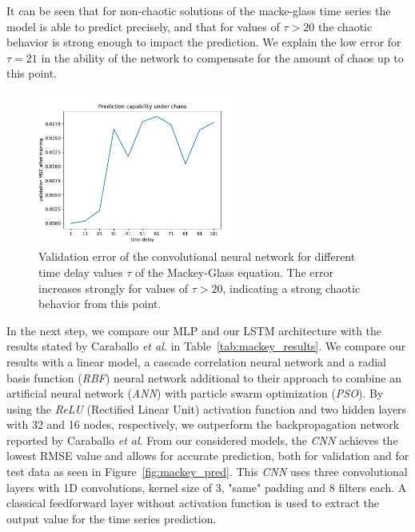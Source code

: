 \documentclass{article}
\begin{document}
It can be seen that for non-chaotic solutions of the macke-glass time series the
model is able to predict precisely, and that for values of $\tau > 20$ the
chaotic behavior is strong enough to impact the prediction. We explain the low
error for $\tau = 21$ in the ability of the network to compensate for the amount
of chaos up to this point.

\begin{figure}
    \centering
    \includegraphics[width=0.6\textwidth]{figures/mackey_glass_cnn.pdf}
    \caption{Validation error of the convolutional neural network for different
        time delay values $\tau$ of the Mackey-Glass equation. The error increases
        strongly for values of $\tau > 20$, indicating a strong chaotic behavior
        from this point.}
    \label{fig:mackey_cnn}
\end{figure}

In the next step, we compare our MLP and our LSTM
architecture with the results stated by Caraballo \textit{et al.}
\cite{caraballo2016} in Table~\ref{tab:mackey_results}. We
compare our results with a linear model, a cascade correlation neural network
and a radial basis function (\emph{RBF})
neural network additional to their approach to
combine an artificial neural network (\emph{ANN}) with particle swarm
optimization (\emph{PSO}). By
using the \emph{ReLU} (Rectified Linear Unit) activation function and two
hidden layers with 32 and 16 nodes, respectively, we outperform the
backpropagation network reported by Caraballo \textit{et al}.
From our considered models, the \emph{CNN} achieves the lowest RMSE value and
allows for accurate prediction, both for validation and for test data as seen
in Figure~\ref{fig:mackey_pred}. This \emph{CNN} uses three convolutional layers
with 1D convolutions, kernel size of 3, "same" padding and 8
filters each. A classical
feedforward layer without activation function is used to extract the output
value for the time series prediction.
\end{document}
